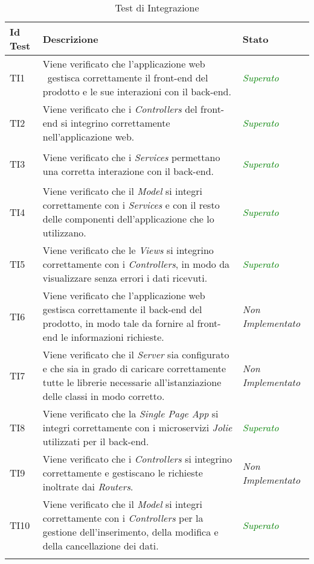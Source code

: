 	\normalsize
	\begin{longtable}{|>{\centering\arraybackslash}p{1.5cm}|>{\centering\arraybackslash}p{8cm} | >{\centering\arraybackslash}p{3.8cm}|}
		\hline \rowcolor{Gray}
		\textbf{Id Test} & \textbf{Descrizione} & \textbf{Stato}\\
		\hline
		\endhead
		\hypertarget{TI1}{TI1} & Viene verificato che l’applicazione web \progetto\ gestisca
		correttamente il front-end del prodotto e le sue interazioni con il back-end. & \textcolor{Green}{\textit{Superato}}\\ \hline
		\hypertarget{TI2}{TI2} & Viene verificato che i \textit{Controllers} del front-end si integrino
		correttamente nell’applicazione web. & \textcolor{Green}{\textit{Superato}}\\ \hline
		\hypertarget{TI3}{TI3} & Viene verificato che i \textit{Services} permettano una corretta interazione con il back-end. & \textcolor{Green}{\textit{Superato}}\\ \hline
		\hypertarget{TI4}{TI4} & Viene verificato che il \textit{Model} si integri correttamente con i
		\textit{Services} e con il resto delle componenti dell’applicazione che lo utilizzano. & \textcolor{Green}{\textit{Superato}}\\ \hline
		\hypertarget{TI5}{TI5} & Viene verificato che le \textit{Views} si integrino correttamente con i
		\textit{Controllers}, in modo da visualizzare senza errori i dati ricevuti. & \textcolor{Green}{\textit{Superato}}\\ \hline
		\hypertarget{TI6}{TI6} & Viene verificato che l’applicazione web gestisca	correttamente il back-end del prodotto, in modo tale da fornire al front-end le informazioni richieste. & \textit{Non Implementato}\\ \hline
		\hypertarget{TI7}{TI7} & Viene verificato che il \textit{Server} sia configurato e che sia in grado di caricare correttamente tutte le librerie necessarie all'istanziazione delle classi in modo corretto. & \textit{Non Implementato}\\ \hline
		\hypertarget{TI8}{TI8} & Viene verificato che la \textit{Single Page App} si integri correttamente con i microservizi \textit{Jolie} utilizzati per il back-end. & \textcolor{Green}{\textit{Superato}}\\ \hline
		\hypertarget{TI9}{TI9} & Viene verificato che i \textit{Controllers} si integrino correttamente
		e gestiscano le richieste inoltrate dai \textit{Routers}. & \textit{Non Implementato}\\ \hline
		\hypertarget{TI10}{TI10} & Viene verificato che il \textit{Model} si integri correttamente con i
		\textit{Controllers} per la gestione dell’inserimento, della modifica e della cancellazione dei dati. & \textcolor{Green}{\textit{Superato}}\\ \hline
		\caption[Test di Integrazione]{Test di Integrazione}
		\label{tabella:test2}
	\end{longtable}
	\clearpage
	
